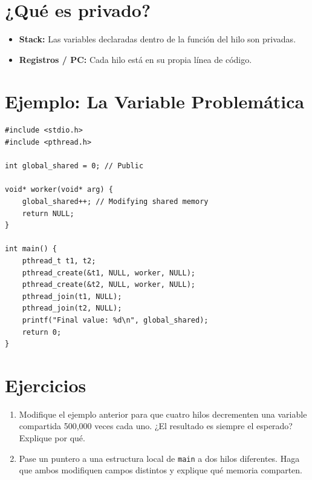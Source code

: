 \documentclass[12pt,a4paper]{article}
\begin{document}
\section{¿Qué es privado?}
\begin{itemize}
    \item \textbf{Stack:} Las variables declaradas dentro de la función del hilo son privadas.
    \item \textbf{Registros / PC:} Cada hilo está en su propia línea de código.
\end{itemize}

\section{Ejemplo: La Variable Problemática}
\begin{lstlisting}
#include <stdio.h>
#include <pthread.h>

int global_shared = 0; // Public

void* worker(void* arg) {
    global_shared++; // Modifying shared memory
    return NULL;
}

int main() {
    pthread_t t1, t2;
    pthread_create(&t1, NULL, worker, NULL);
    pthread_create(&t2, NULL, worker, NULL);
    pthread_join(t1, NULL);
    pthread_join(t2, NULL);
    printf("Final value: %d\n", global_shared);
    return 0;
}
\end{lstlisting}

\section{Ejercicios}
\begin{enumerate}
    \item Modifique el ejemplo anterior para que cuatro hilos decrementen una variable compartida 500,000 veces cada uno. ¿El resultado es siempre el esperado? Explique por qué.
    \item Pase un puntero a una estructura local de \texttt{main} a dos hilos diferentes. Haga que ambos modifiquen campos distintos y explique qué memoria comparten.
\end{enumerate}
\end{document}
